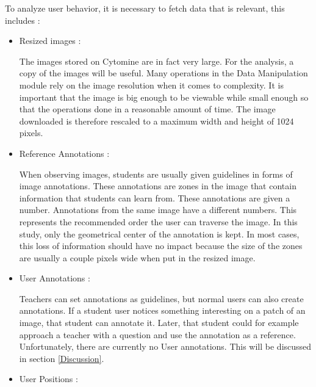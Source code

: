 \documentclass[a4paper,11pt]{report}
\numberwithin{figure}{section} %
\begin{document}
          To analyze user behavior, it is necessary to fetch data that is relevant, this includes :
          
          \begin{itemize}
          \item[\textbullet] Resized images :\newline
          
          The images stored on Cytomine are in fact very large. For the analysis, a copy of the images will be useful. Many operations in the Data Manipulation module rely on the image resolution when it comes to complexity. It is important that the image is big enough to be viewable while small enough so that the operations done in a reasonable amount of time. The image downloaded is therefore rescaled to a maximum width and height of 1024 pixels.\\
          \item[\textbullet] Reference Annotations :\newline
          
          When observing images, students are usually given guidelines in forms of image annotations. These annotations are zones in the image that contain information that students can learn from. These annotations are given a number. Annotations from the same image have a different numbers. This represents the recommended order the user can traverse the image. In this study, only the geometrical center of the annotation is kept. In most cases, this loss of information should have no impact because the size of the zones are usually a couple pixels wide when put in the resized image.\\
		\item[\textbullet]  User Annotations :\newline
        
        Teachers can set annotations as guidelines, but normal users can also create annotations. If a student user notices something interesting on a patch of an image, that student can annotate it. Later, that student could for example approach a teacher with a question and use the annotation as a reference. Unfortunately, there are currently no User annotations. This will be discussed in section \ref{Discussion}.\\
        
        \item[\textbullet]  User Positions :\newline
        

\end{itemize}
\end{document}
